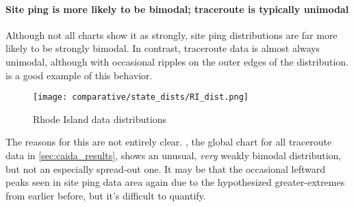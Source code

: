 \paragraph{Site ping is more likely to be bimodal; traceroute is typically unimodal}

Although not all \kde charts show it as strongly, site ping distributions are far more likely to be strongly bimodal. In contrast, traceroute data is almost always unimodal, although with occasional ripples on the outer edges of the distribution.  is a good example of this behavior.

\begin{figure}
    \centering
    \texttt{[image: comparative/state\_dists/RI\_dist.png]}
    \caption{Rhode Island data distributions}
    \label{fig:comparative_ri_dist}
\end{figure}

The reasons for this are not entirely clear. , the global \kde chart for all traceroute data in \cref{sec:caida_results}, shows an unusual, \textit{very} weakly bimodal distribution, but not an especially spread-out one. It may be that the occasional leftward peaks seen in site ping data area again due to the hypothesized greater-extremes from earlier before, but it's difficult to quantify.
